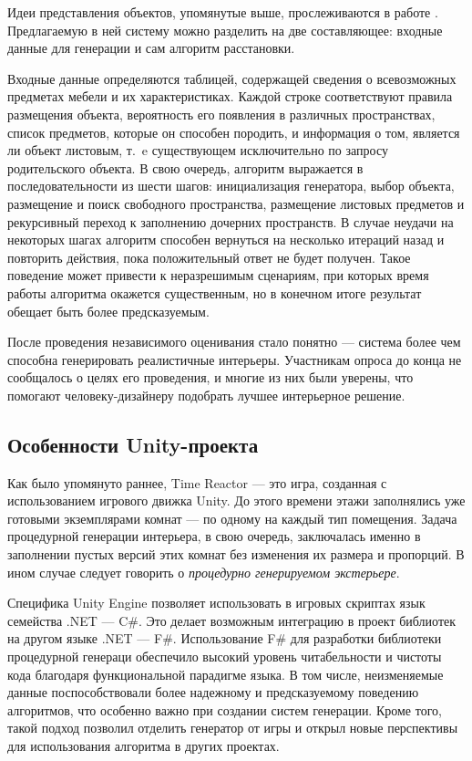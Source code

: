 Идеи представления объектов, упомянутые выше, прослеживаются в работе \cite{lidberg2020hierarchical}. Предлагаемую в ней систему можно разделить на две составляющее: входные данные для генерации и сам алгоритм расстановки.

Входные данные определяются таблицей, содержащей сведения о всевозможных предметах мебели и их характеристиках.
Каждой строке соответствуют правила размещения объекта, вероятность его появления в различных пространствах, список предметов, которые он способен породить, и информация о том, является ли объект листовым, т.~e существующем исключительно по запросу родительского объекта. В свою очередь, алгоритм выражается в последовательности из шести шагов: инициализация генератора, выбор объекта, размещение и поиск свободного пространства, размещение листовых предметов и рекурсивный переход к заполнению дочерних пространств. В случае неудачи на некоторых шагах алгоритм способен вернуться на несколько итераций назад и повторить действия, пока положительный ответ не будет получен. Такое поведение может привести к неразрешимым сценариям, при которых время работы алгоритма окажется существенным, но в конечном итоге результат обещает быть более предсказуемым. 

После проведения независимого оценивания стало понятно --- система более чем способна генерировать реалистичные интерьеры. Участникам опроса до конца не сообщалось о целях его проведения, и многие из них были уверены, что помогают человеку-дизайнеру подобрать лучшее интерьерное решение.

\subsection{Особенности Unity-проекта}

Как было упомянуто раннее, Time Reactor --- это игра, созданная с использованием игрового движка Unity. До этого времени этажи заполнялись уже готовыми экземплярами комнат --- по одному на каждый тип помещения. Задача процедурной генерации интерьера, в свою очередь, заключалась именно в заполнении пустых версий этих комнат без изменения их размера и пропорций. В ином случае следует говорить о \textit{процедурно генерируемом экстерьере}.

Специфика Unity Engine позволяет использовать в игровых скриптах язык семейства .NET --- C\#. Это делает возможным интеграцию в проект библиотек на другом языке .NET --- F\#. Использование F\# для разработки библиотеки процедурной генераци обеспечило высокий уровень читабельности и чистоты кода благодаря функциональной парадигме языка. В том числе, неизменяемые данные поспособствовали более надежному и предсказуемому поведению алгоритмов, что особенно важно при создании систем генерации. Кроме того, такой подход позволил отделить генератор от игры и открыл новые перспективы для использования алгоритма в других проектах.  

